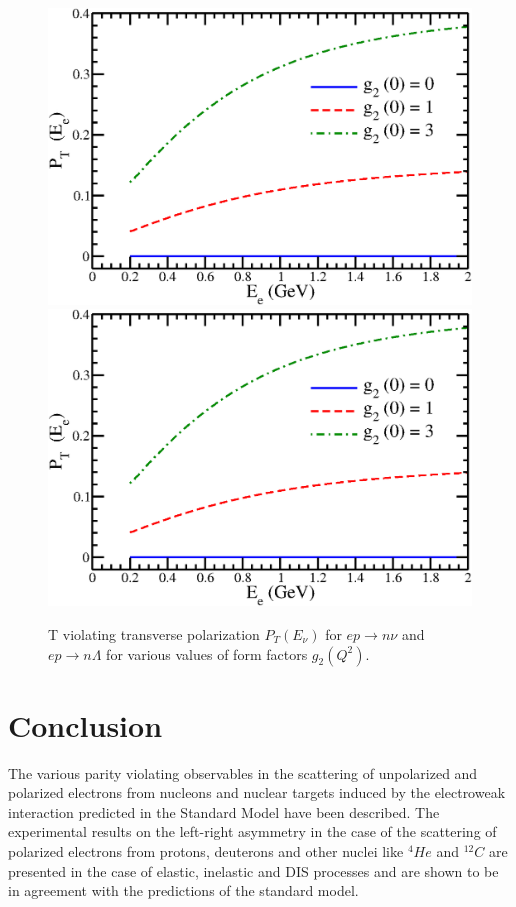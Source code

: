 \begin{figure}[H]
\centering
\includegraphics[scale=0.175]{src/images/chap9/lambda.jpg}\;
\includegraphics[scale=0.175]{src/images/chap9/lambda.jpg}
\smallskip

\caption{T violating transverse polarization $P_T (E_\nu )$ for $ep  \to  n\nu$ and $ep \to  n \Lambda$ for various values of form factors $g_2 (Q^2)$.}\label{chap9-fig6}
\end{figure}

\section{Conclusion}\label{chap9-sec5}

The various parity violating observables in the scattering of unpolarized and polarized electrons from nucleons and nuclear targets induced  by the electroweak interaction predicted in the Standard Model have been described. The experimental results on the left-right asymmetry in the case of the scattering of polarized electrons from protons, deuterons  and other nuclei like $^4{He}$ and $^{12}{C}$ are presented in the case of elastic, inelastic and DIS processes and are shown to be in agreement with the predictions of the standard model.

